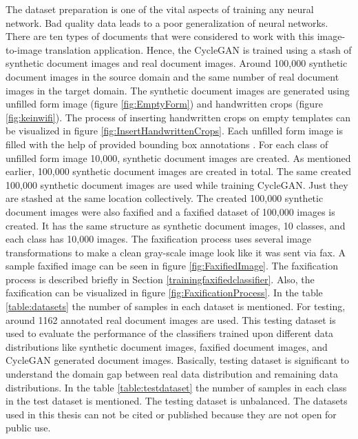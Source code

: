 The dataset preparation is one of the vital aspects of training any neural network. Bad quality data leads to a poor generalization of neural networks. There are ten types of documents that were considered to work with this image-to-image translation application. Hence, the \ac{CycleGAN} is trained using a stash of synthetic document images and real document images. Around 100,000 synthetic document images in the source domain and the same number of real document images in the target domain. The synthetic document images are generated using unfilled form image (figure \ref{fig:EmptyForm}) and handwritten crops (figure \ref{fig:keinwifi}). The process of inserting handwritten crops on empty templates can be visualized in figure \ref{fig:InsertHandwrittenCrops}. Each unfilled form image is filled with the help of provided bounding box annotations \cite{lin2015microsoft}. For each class of unfilled form image 10,000, synthetic document images are created. As mentioned earlier, 100,000 synthetic document images are created in total. The same created 100,000 synthetic document images are used while training \ac{CycleGAN}. Just they are stashed at the same location collectively. The created 100,000 synthetic document images were also faxified and a faxified dataset of 100,000 images is created. It has the same structure as synthetic document images, 10 classes, and each class has 10,000 images. The faxification process uses several image transformations to make a clean gray-scale image look like it was sent via fax. A sample faxified image can be seen in figure \ref{fig:FaxifiedImage}. The faxification process is described briefly in Section \ref{trainingfaxifiedclassifier}. Also, the faxification can be visualized in figure \ref{fig:FaxificationProcess}. In the table \ref{table:datasets} the number of samples in each dataset is mentioned. For testing, around 1162 annotated real document images are used. This testing dataset is used to evaluate the performance of the classifiers trained upon different data distributions like synthetic document images, faxified document images, and \ac{CycleGAN} generated document images. Basically, testing dataset is significant to understand the domain gap between real data distribution and remaining data distributions. In the table \ref{table:testdataset} the number of samples in each class in the test dataset is mentioned. The testing dataset is unbalanced. The datasets used in this thesis can not be cited or published because they are not open for public use.

